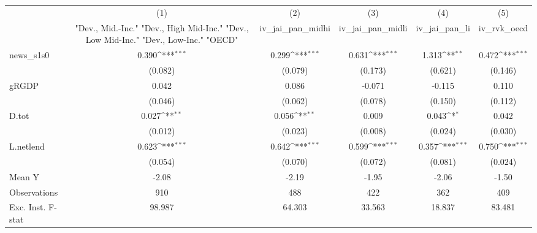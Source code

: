 {
\def\sym#1{\ifmmode^{#1}\else\(^{#1}\)\fi}
\begin{tabular}{l*{5}{c}}
\toprule
            &\multicolumn{1}{c}{(1)}&\multicolumn{1}{c}{(2)}&\multicolumn{1}{c}{(3)}&\multicolumn{1}{c}{(4)}&\multicolumn{1}{c}{(5)}\\
            &\multicolumn{1}{c}{ "Dev., Mid.-Inc." "Dev., High Mid-Inc." "Dev., Low Mid-Inc." "Dev., Low-Inc." "OECD" }&\multicolumn{1}{c}{iv\_jai\_pan\_midhi}&\multicolumn{1}{c}{iv\_jai\_pan\_midli}&\multicolumn{1}{c}{iv\_jai\_pan\_li}&\multicolumn{1}{c}{iv\_rvk\_oecd}\\
\midrule
news\_s1s0   &       0.390\sym{***}&       0.299\sym{***}&       0.631\sym{***}&       1.313\sym{**} &       0.472\sym{***}\\
            &     (0.082)         &     (0.079)         &     (0.173)         &     (0.621)         &     (0.146)         \\
\addlinespace
gRGDP       &       0.042         &       0.086         &      -0.071         &      -0.115         &       0.110         \\
            &     (0.046)         &     (0.062)         &     (0.078)         &     (0.150)         &     (0.112)         \\
\addlinespace
D.tot       &       0.027\sym{**} &       0.056\sym{**} &       0.009         &       0.043\sym{*}  &       0.042         \\
            &     (0.012)         &     (0.023)         &     (0.008)         &     (0.024)         &     (0.030)         \\
\addlinespace
L.netlend   &       0.623\sym{***}&       0.642\sym{***}&       0.599\sym{***}&       0.357\sym{***}&       0.750\sym{***}\\
            &     (0.054)         &     (0.070)         &     (0.072)         &     (0.081)         &     (0.024)         \\
\midrule
Mean Y      &       -2.08         &       -2.19         &       -1.95         &       -2.06         &       -1.50         \\
Observations&         910         &         488         &         422         &         362         &         409         \\
Exc. Inst. F-stat&      98.987         &      64.303         &      33.563         &      18.837         &      83.481         \\
\bottomrule
\end{tabular}
}
